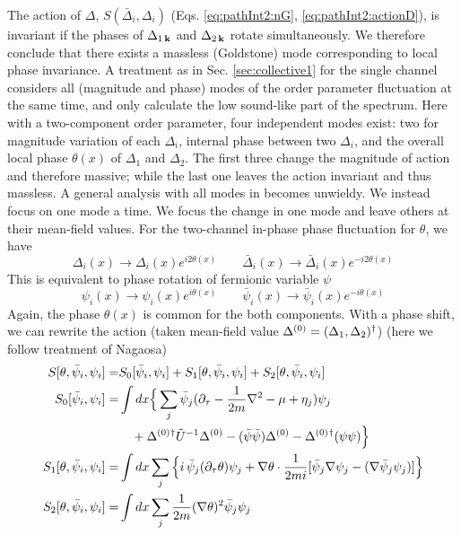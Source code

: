The action of $\Delta$, $S(\bar{\Delta}_i,\Delta_i)$ (Eqs. \ref{eq:pathInt2:nG}, \ref{eq:pathInt2:actionD}), is invariant if the phases of $\Delta_{1\,\mathbf{k}}$ and $\Delta_{2\,\mathbf{k}}$ rotate simultaneously. We therefore conclude that there exists a massless (Goldstone) mode corresponding to local phase invariance. A treatment as in Sec. \ref{sec:collective1} for the single channel considers all (magnitude and phase) modes of the order parameter fluctuation at the same time, and only calculate  the low sound-like part of the spectrum. Here with a two-component order parameter, four independent modes exist:   two for magnitude variation of each $\Delta_i$,  internal phase between two $\Delta_i$, and the overall local phase $\theta(x)$ of $\Delta_1$ and $\Delta_2$.  The first three change the magnitude of action and therefore massive; while the last one leaves the action invariant and thus massless.  A general analysis with all modes in becomes unwieldy.  
We instead focus on one mode a time. We focus the change in one mode and leave others at their mean-field values.  For the  two-channel in-phase phase fluctuation for $\theta$, we have 
\begin{equation*}
\Delta_{i}(x)\rightarrow{}\Delta_{i}(x)e^{i2\theta(x)}\qquad{}
\bar{\Delta}_{i}(x)\rightarrow{}\bar{\Delta}_{i}(x)e^{-i2\theta(x)}
\end{equation*}
This is equivalent to  phase  rotation of fermionic variable $\psi$
\begin{equation*}
\psi_{i}(x)\rightarrow{}\psi_{i}(x)e^{i\theta(x)}\qquad{}
\bar{\psi}_{i}(x)\rightarrow{}\bar{\psi}_{i}(x)e^{-i\theta(x)}
\end{equation*}
Again, the phase $\theta(x)$ is common for the both components.   With a phase shift, we can rewrite the action (taken mean-field value $\Delta^{(0)}=(\Delta_1,\Delta_2)^{\dagger}$) (here we  follow treatment of Nagaosa\cite{Nagaosa})
\begin{subequations}\label{eq:pathInt2:actionPhase}
\begin{align}
S[\theta,\bar\psi_{i},\psi_{i}]=&S_0[\bar\psi_{i},\psi_{i}]+S_1[\theta,\bar\psi_{i},\psi_{i}]+S_2[\theta,\bar\psi_{i},\psi_{i}]\\
S_0[\bar\psi_{i},\psi_{i}]=&\int{dx}
\Big\{\sum_{j}\bar\psi_{j}(\partial_\tau-\frac{1}{2m}\nabla^{2}-\mu+\eta_{j})\psi_{j}\nonumber\\
&\quad+\Delta^{(0)}{}^{\dagger}\tilde{U}^{-1}\Delta^{(0)}-(\bar\psi\bar\psi)\Delta^{(0)}-{\Delta^{(0)}}{}^{\dagger}(\psi\psi)\Big\}\\
S_1[\theta,\bar\psi_{i},\psi_{i}]=&\int{dx}\sum_{j}\Big\{
   i\,\bar\psi_{j}(\partial_{\tau}\theta)\psi_{j}+\nabla\theta\cdot\frac{1}{2mi}[\bar\psi_{j}\nabla\psi_{j}-(\nabla\bar{\psi}_{j}\psi_{j})]\Big\}\\
S_2[\theta,\bar\psi_{i},\psi_{i}]=&\int{dx}\sum_{j}\frac{1}{2m}(\nabla\theta)^{2}\bar\psi_{j}\psi_{j}
\end{align}
\end{subequations}
